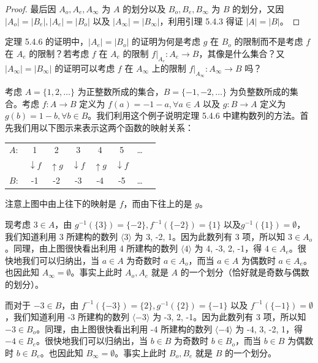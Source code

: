 \begin{proof}
最后因 $A_o, A_e, A_\infty$ 为 $A$ 的划分以及 $B_o, B_e, B_\infty$ 为 $B$ 的划分，又因 $|A_o| = |B_e|, |A_e| = |B_o|$ 以及 $|A_\infty| = |B_\infty|$，利用引理 5.4.3 得证 $|A| = |B|$。
\end{proof}

\begin{question}
定理 5.4.6 的证明中，$|A_e| = |B_o|$ 的证明为何是考虑 $g$ 在 $B_o$ 的限制而不是考虑 $f$ 在 $A_e$ 的限制？若考虑 $f$ 在 $A_e$ 的限制 $f|_{A_e} : A_e \to B$，其像是什么集合？又 $|A_\infty| = |B_\infty|$ 的证明可以考虑 $f$ 在 $A_\infty$ 上的限制 $f|_{A_\infty} : A_\infty \to B$ 吗？
\end{question}

\begin{example}
考虑 $A = \{1, 2, \dots\}$ 为正整数所成的集合，$B = \{-1, -2, \dots\}$ 为负整数所成的集合。考虑 $f : A \to B$ 定义为 $f(a) = -1 - a, \forall a \in A$ 以及 $g : B \to A$ 定义为 $g(b) = 1 - b, \forall b \in B$。我们利用这个例子说明定理 5.4.6 中建构数列的方法。首先我们用以下图示来表示这两个函数的映射关系：
\begin{center}
    \begin{tabular}{cccccccc}
        $A:$ & 1 & 2 & 3 & 4 & 5 & \dots \\
        & $\downarrow f$ & $\uparrow g$ & $\downarrow f$ & $\uparrow g$ & $\downarrow f$ & \\
        $B:$ & -1 & -2 & -3 & -4 & -5 & \dots
    \end{tabular}
\end{center}
注意上图中由上往下的映射是 $f$，而由下往上的是 $g$。

现考虑 $3 \in A$，由 $g^{-1}(\{3\}) = \{-2\}, f^{-1}(\{-2\}) = \{1\}$ 以及\linebreak $g^{-1}(\{1\}) = \emptyset$，我们知道利用 3 所建构的数列 $\langle 3 \rangle$ 为 3, -2, 1。因为此数列有 3 项，所以知 $3 \in A_o$。同理，由上图很快看出利用 4 所建构的数列 $\langle 4 \rangle$ 为 4, -3, 2, -1，得 $4 \in A_e$。很快地我们可以归纳出，当 $a \in A$ 为奇数时 $a \in A_o$，而当 $a \in A$ 为偶数时 $a \in A_e$。也因此知 $A_\infty = \emptyset$。事实上此时 $A_o, A_e$ 就是 $A$ 的一个划分（恰好就是奇数与偶数的划分）。

而对于 $-3 \in B$，由 $f^{-1}(\{-3\}) = \{2\}, g^{-1}(\{2\}) = \{-1\}$ 以及 $f^{-1}(\{-1\}) = \emptyset$，我们知道利用 -3 所建构的数列 $\langle -3 \rangle$ 为 -3, 2, -1。因为此数列有 3 项，所以知 $-3 \in B_o$。同理，由上图很快看出利用 -4 所建构的数列 $\langle -4 \rangle$ 为 -4, 3, -2, 1，得 $-4 \in B_e$。很快地我们可以归纳出，当 $b \in B$ 为奇数时 $b \in B_o$，而当 $b \in B$ 为偶数时 $b \in B_e$。也因此知 $B_\infty = \emptyset$。事实上此时 $B_o, B_e$ 就是 $B$ 的一个划分。


\end{example}
